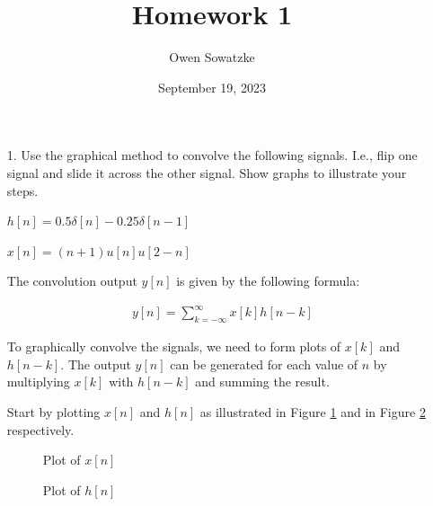 \documentclass[fleqn]{article}
\title{Homework 1}
\author{Owen Sowatzke}
\date{September 19, 2023}
\begin{document}
	\setlength{\abovedisplayskip}{0pt}
	\setlength{\belowdisplayskip}{0pt}
	\setlength{\abovedisplayshortskip}{0pt}
	\setlength{\belowdisplayshortskip}{0pt}
	\setlength{\mathindent}{0pt}
	\doublespacing
	\maketitle
	
	\begin{enumerate}
		\item[1.] Use the graphical method to convolve the following signals. I.e., flip one signal and slide it across the other signal. Show graphs to illustrate your steps.
		
		$h[n] = 0.5\delta[n] - 0.25\delta[n-1]$
		
		$x[n] = (n+1)u[n]u[2-n]$
		
		The convolution output $y[n]$ is given by the following formula:
		
		\begin{align*}
			y[n] = \sum_{k=-\infty}^{\infty}{x[k]h[n-k]}
		\end{align*}
		
		To graphically convolve the signals, we need to form plots of $x[k]$ and \newline $h[n-k]$. The output $y[n]$ can be generated for each value of $n$ by multiplying $x[k]$ with $h[n-k]$ and summing the result.
		
		Start by plotting $x[n]$ and $h[n]$ as illustrated in Figure \ref{prob1_xn_plot} and in Figure \ref{prob1_hn_plot} respectively.
		
		\begin{figure}[H]				
			\centerline{}
			\caption{Plot of $x[n]$}
			\label{prob1_xn_plot}
		\end{figure}
		
		\begin{figure}[H]				
			\centerline{}
			\caption{Plot of $h[n]$}
			\label{prob1_hn_plot}
		\end{figure}
		

\end{enumerate}
\end{document}
